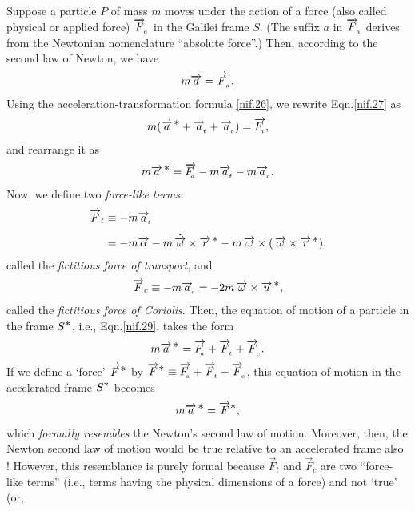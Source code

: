 Suppose a particle $P$ of mass $m$ moves under the 
action of a force (also called physical or applied 
force)            $\overrightarrow{F}_{{_{\hspace*{-1.5pt}{a}}}}$ in the Galilei 
frame $S$. (The suffix $a$ in $\overrightarrow{F}_{{_{\hspace*{-1.5pt}{a}}}}$ 
derives from the Newtonian nomenclature ``absolute 
force''.) Then, according to the second law of Newton, 
we have
\begin{align}\label{nif.27}
m\overrightarrow{a}=\overrightarrow{F}_{{_{\hspace*{-1.5pt}{a}}}}.
\end{align}
Using the acceleration-transformation formula 
\eqref{nif.26}, we
rewrite Eqn.\eqref{nif.27} as
\begin{align}\label{nif.28}
m({\overrightarrow{a}^{\,{\textstyle \ast}}}+\overrightarrow{a}_{{_{\hspace*{-1.5pt}{t}}}} + \overrightarrow{a}_{{_{\hspace*{-1.5pt}{c}}}}
)=\overrightarrow{F_{{_{\hspace*{-1.5pt}{a}}}}},
\end{align}
and rearrange it as
\begin{align}\label{nif.29}
m{\overrightarrow{a}^{\,{\textstyle \ast}}}=\overrightarrow{F_{{_{\hspace*{-1.5pt}{a}}}}}-m\overrightarrow{a}_{{_{\hspace*{-1.5pt}{t}}}}
-m\overrightarrow{a}_{{_{\hspace*{-1.5pt}{c}}}}.
\end{align}
Now, we define two \textsl{force-like terms}:
\begin{align}\label{nif.30}
\overrightarrow{F}_{t}& \equiv -m\overrightarrow{a}_{{_{\hspace*{-1.5pt}{t}}}}\notag\\&
=-m\overrightarrow{\alpha}
-m{\overset{\hspace*{1.5pt}\centerdot}{\,\overrightarrow{{\omega}}} }\times \overrightarrow{r}^{\,{\textstyle \ast} }
-m\,\overrightarrow{{\omega}}\times ( \,\overrightarrow{{\omega}} \times 
\overrightarrow{r}^{\,{\textstyle \ast}}),
\end{align}
called the \textsl{fictitious force of transport}, and
\begin{align}\label{nif.31}
\overrightarrow{F}_{c} \equiv -m \overrightarrow{a}_{{_{\hspace*{-1.5pt}{c}}}}
=-2m\,\overrightarrow{{\omega}}\times{\overrightarrow{u}^{\,{\ensuremath{\textstyle \ast}}}},
\end{align}
called the \textsl{fictitious force of Coriolis}. Then, the 
equation of motion of a particle in the frame $S^{\textstyle \ast}$, 
i.e., Eqn.\eqref{nif.29}, takes the form
\begin{align}\label{nif.37x}
m{\overrightarrow{a}^{\,{\textstyle \ast}}}=\overrightarrow{F_{{_{\hspace*{-1.5pt}{a}}}}}+\overrightarrow{F}_{{_{\hspace*{-1.5pt}{t}}}}
+\overrightarrow{F}_{{_{\hspace*{-1.5pt}{c}}}}.
\end{align}
If we define a `force' $\overrightarrow{F}^{\textstyle \ast}$ by 
$\overrightarrow{F}^{\textstyle \ast}\equiv 
\overrightarrow{F_{{_{\hspace*{-1.5pt}{a}}}}}+\overrightarrow{F}_{{_{\hspace*{-1.5pt}{t}}}}  
+\overrightarrow{F}_{{_{\hspace*{-1.5pt}{c}}}}$, 
this equation of motion in the accelerated frame $S^{\textstyle \ast}$ 
becomes
\begin{align}
m{\overrightarrow{a}^{\,{\textstyle \ast}}}=\overrightarrow{F}^{\textstyle \ast},
\end{align}
which \textsl{formally resembles} the Newton's second 
law of motion.  Moreover, then, the Newton second law 
of motion would be true relative to an accelerated 
frame also ! However, this resemblance is purely formal 
because $\vec{F}_{t}$ and $\vec{F}_{c}$ are two 
``force-like terms'' (i.e., terms having the physical 
dimensions of a force) and not `true' (or, 
